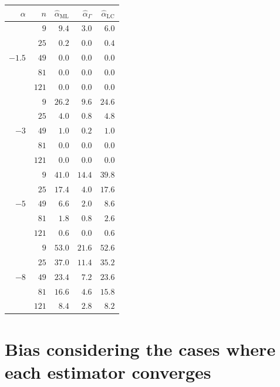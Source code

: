 \documentclass[10pt,a4paper]{article}
\begin{document}
\;
\begin{minipage}{0.5\linewidth}
	\begin{tabular}{rrrrr}
	\toprule
	$\alpha$ & $n$ & $\widehat{\alpha}_{\text{ML}}$ & $\widehat{\alpha}_{\Gamma}$ & $\widehat{\alpha}_{\text{LC}}$\\  
	\midrule
	\multirow{5 }{*}{$-1.5$}
	& $9$    & $9.4$ & $3.0$ & $6.0$ \\ 
	& $25$   & $0.2$ & $0.0$ & $0.4$ \\ 
	& $49$   & $0.0$ & $0.0$ & $0.0$ \\ 
	& $81$   & $0.0$ & $0.0$ & $0.0$ \\ 
	& $121$  & $0.0$ & $0.0$ & $0.0$ \\  
	\midrule
	\multirow{5 }{*}{$-3$} 
	& $9$   & $26.2$ & $9.6$ & $24.6$ \\ 
	& $25$  & $4.0$  & $0.8$ & $4.8$  \\ 
	& $49$  & $1.0$  & $0.2$ & $1.0$  \\ 
	& $81$  & $0.0$  & $0.0$ & $0.0$  \\ 
	& $121$ & $0.0$  & $0.0$ & $0.0$  \\	  
	\midrule
	\multirow{5 }{*}{$-5$} 
	& $9$   & $41.0$ & $14.4$ & $39.8$ \\ 
	& $25$  & $17.4$ & $4.0$  & $17.6$ \\ 
	& $49$  & $6.6$  & $2.0$  & $8.6$  \\ 
	& $81$  & $1.8$  & $0.8$  & $2.6$  \\ 
	& $121$ & $0.6$  & $0.0$  & $0.6$  \\   
	\midrule
	\multirow{5 }{*}{$-8$} 
	& $9$   & $53.0$ & $21.6$ & $52.6$ \\ 
	& $25$  & $37.0$ & $11.4$ & $35.2$ \\ 
	& $49$  & $23.4$ & $7.2$  & $23.6$ \\ 
	& $81$  & $16.6$ & $4.6$  & $15.8$ \\ 
	& $121$ & $8.4$  & $2.8$  & $8.2$  \\ 
	\bottomrule
\end{tabular}
\end{minipage}

\vspace{1cm}
\section{Bias considering the cases where each estimator converges}
\end{document}
